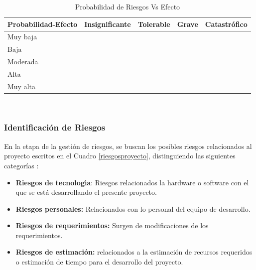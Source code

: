 \begin{table}[h]
    \begin{tabular}{ | m{3cm} | m{3cm}| m{2cm} | m{2cm} |m{2cm} |}
        \hline
        Probabilidad-Efecto & Insignificante & Tolerable &Grave & Catastrófico\\
        \hline
        Muy baja& \cellcolor[HTML]{84D65C} & \cellcolor[HTML]{84D65C}&\cellcolor[HTML]{84D65C} &\cellcolor[HTML]{FFFF00}\\
        \hline
        Baja & \cellcolor[HTML]{84D65C} & \cellcolor[HTML]{84D65C}&\cellcolor[HTML]{FFFF00} &\cellcolor[HTML]{FFFF00}\\
        \hline
        Moderada& \cellcolor[HTML]{84D65C} &\cellcolor[HTML]{FFFF00} &\cellcolor[HTML]{FFFF00} &\cellcolor[HTML]{FF3333} \\
        \hline
        Alta  &\cellcolor[HTML]{FFFF00}  &\cellcolor[HTML]{FFFF00} & \cellcolor[HTML]{FF3333} &\cellcolor[HTML]{FF3333} \\
        \hline
        Muy alta & \cellcolor[HTML]{FFFF00} &\cellcolor[HTML]{FF3333}  & \cellcolor[HTML]{FF3333} &\cellcolor[HTML]{FF3333} \\
        \hline
    \end{tabular}\\
    \caption{Probabilidad de Riesgos Vs Efecto}
    \label{probriesgos}
\end{table}

\subsubsection{Identificación de Riesgos}

En la etapa de la gestión de riesgos, se buscan los posibles riesgos relacionados al proyecto escritos en el Cuadro \ref{riesgosproyecto}, distinguiendo las siguientes categorías :
\begin{itemize}
    \item \textbf{Riesgos de tecnologı́a}: Riesgos relacionados la hardware o software con el que se está desarrollando el presente proyecto.
    \item \textbf{Riesgos personales:} Relacionados con lo personal del equipo de desarrollo.
    \item \textbf{Riesgos de requerimientos:} Surgen de modificaciones de los requerimientos.
    \item \textbf{Riesgos de estimación:} relacionados a la estimación de recursos requeridos o estimación de tiempo para el desarrollo del proyecto.
\end{itemize}

